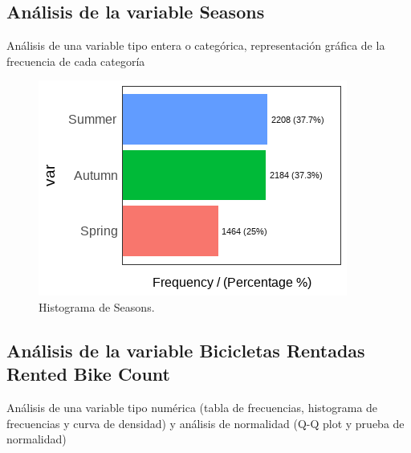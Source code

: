\documentclass[]{elsarticle} %
\begin{document}
\subsection{Análisis de la variable Seasons}

Análisis de una variable tipo entera o categórica, representación
gráfica de la frecuencia de cada categoría

\begin{figure}[H]

{\centering \includegraphics[width=1\linewidth]{barplot_seasons} 

}

\caption{\label{fig:fig1}Histograma de Seasons.}\label{fig:fig1}
\end{figure}

\newpage
\subsection{Análisis de la variable Bicicletas Rentadas Rented Bike Count}

Análisis de una variable tipo numérica (tabla de frecuencias, histograma
de frecuencias y curva de densidad) y análisis de normalidad (Q-Q plot y
prueba de normalidad)
\end{document}
